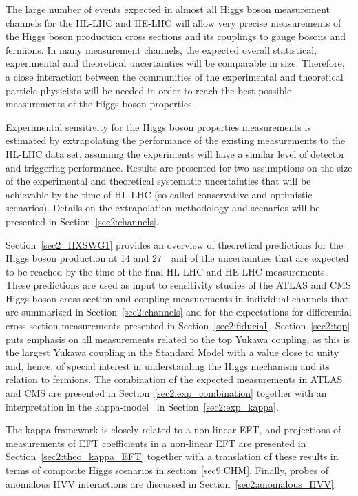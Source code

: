 

The large number of events expected in almost all Higgs boson measurement channels for the HL-LHC and HE-LHC will allow very precise measurements of the Higgs boson production cross sections and its couplings to gauge bosons and fermions. In many measurement channels, the expected overall statistical, experimental and theoretical uncertainties will be comparable in size. Therefore, a close interaction between the communities of the experimental and theoretical particle physicists will be needed in order to reach the best possible measurements of the Higgs boson properties.

Experimental sensitivity for the Higgs boson properties measurements is estimated by extrapolating the performance of the existing measurements to the HL-LHC data set, assuming the experiments will have a similar level of detector and triggering performance. Results are presented for two assumptions on the size of the experimental and theoretical systematic uncertainties that will be achievable by the time of HL-LHC (so called conservative and optimistic scenarios). Details on the extrapolation methodology and scenarios will be presented in Section~\ref{sec2:channels}.

Section~\ref{sec2_HXSWG1} provides an overview of theoretical predictions for the Higgs boson production at 14 and 27~\UTeV\ and of the uncertainties that are expected to be reached by the time of the final HL-LHC and HE-LHC measurements. 
These predictions are used as input to sensitivity studies of the ATLAS and CMS Higgs boson cross section and coupling measurements in individual channels that are summarized in Section~\ref{sec2:channels} and for the expectations for differential cross section measurements presented in Section~\ref{sec2:fiducial}.
Section~\ref{sec2:top} puts emphasis on all measurements related to the top Yukawa coupling, as this is the largest Yukawa coupling in the Standard Model with a value close to unity and, hence, of special interest in understanding the Higgs mechanism and its relation to fermions.
The combination of the expected measurements in ATLAS and CMS are presented in Section~\ref{sec2:exp_combination} together with an interpretation in the kappa-model~\cite{LHCHiggsCrossSectionWorkingGroup:2012nn,Heinemeyer:2013tqa} in Section~\ref{sec2:exp_kappa}.

The kappa-framework is closely related to a non-linear EFT, and projections of measurements of EFT coefficients in a non-linear EFT are presented in Section~\ref{sec2:theo_kappa_EFT} together with a translation of these results in terms of composite Higgs scenarios in section~\ref{sec9:CHM}.
Finally, probes of anomalous HVV interactions are discussed in Section~\ref{sec2:anomalous_HVV}.
